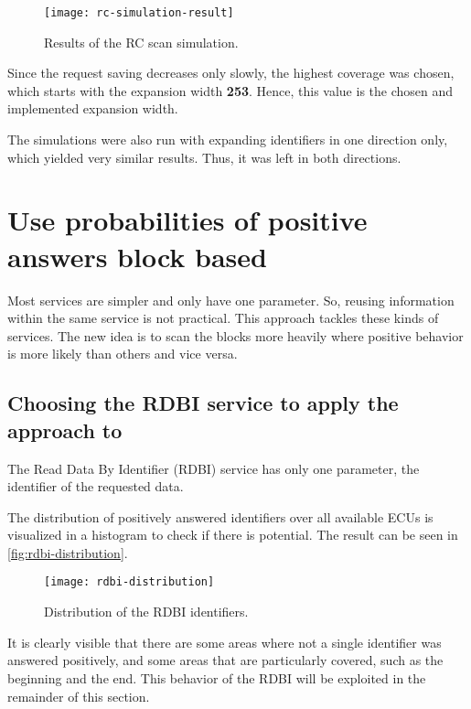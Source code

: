 \begin{figure}[htb]
    \centering
    \texttt{[image: rc-simulation-result]}
    \caption{Results of the RC scan simulation.}
    \label{fig:rc-simulation-result}
\end{figure}

Since the request saving decreases only slowly, the highest coverage was chosen, which starts with the expansion width \textbf{253}. Hence, this value is the chosen and implemented expansion width.

The simulations were also run with expanding identifiers in one direction only, which yielded very similar results. Thus, it was left in both directions.


\section{Use probabilities of positive answers block based}

Most services are simpler and only have one parameter. So, reusing information within the same service is not practical. This approach tackles these kinds of services. The new idea is to scan the blocks more heavily where positive behavior is more likely than others and vice versa.

\subsection{Choosing the RDBI service to apply the approach to}

The Read Data By Identifier (RDBI) service has only one parameter, the identifier of the requested data.

The distribution of positively answered identifiers over all available ECUs is visualized in a histogram to check if there is potential. The result can be seen in \autoref{fig:rdbi-distribution}.

\begin{figure}[htb]
    \centering
    \texttt{[image: rdbi-distribution]}
    \caption{Distribution of the RDBI identifiers.}
    \label{fig:rdbi-distribution}
\end{figure}

It is clearly visible that there are some areas where not a single identifier was answered positively, and some areas that are particularly covered, such as the beginning and the end. This behavior of the RDBI will be exploited in the remainder of this section.

